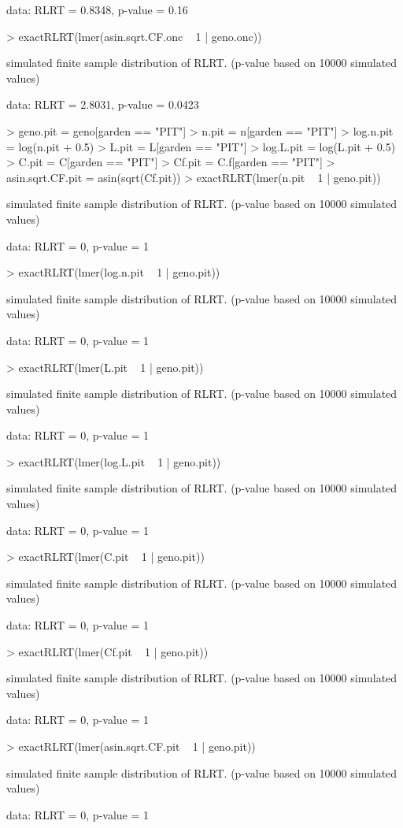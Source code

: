 \documentclass[11pt]{amsart}
\begin{document}
\begin{Schunk}
data:  
RLRT = 0.8348, p-value = 0.16\begin{Sinput}
> exactRLRT(lmer(asin.sqrt.CF.onc ~ 1 | geno.onc))
\end{Sinput}
	simulated finite sample distribution of RLRT.  (p-value based on 10000
	simulated values)

data:  
RLRT = 2.8031, p-value = 0.0423\begin{Sinput}
> geno.pit = geno[garden == "PIT"]
> n.pit = n[garden == "PIT"]
> log.n.pit = log(n.pit + 0.5)
> L.pit = L[garden == "PIT"]
> log.L.pit = log(L.pit + 0.5)
> C.pit = C[garden == "PIT"]
> Cf.pit = C.f[garden == "PIT"]
> asin.sqrt.CF.pit = asin(sqrt(Cf.pit))
> exactRLRT(lmer(n.pit ~ 1 | geno.pit))
\end{Sinput}
	simulated finite sample distribution of RLRT.  (p-value based on 10000
	simulated values)

data:  
RLRT = 0, p-value = 1\begin{Sinput}
> exactRLRT(lmer(log.n.pit ~ 1 | geno.pit))
\end{Sinput}
	simulated finite sample distribution of RLRT.  (p-value based on 10000
	simulated values)

data:  
RLRT = 0, p-value = 1\begin{Sinput}
> exactRLRT(lmer(L.pit ~ 1 | geno.pit))
\end{Sinput}
	simulated finite sample distribution of RLRT.  (p-value based on 10000
	simulated values)

data:  
RLRT = 0, p-value = 1\begin{Sinput}
> exactRLRT(lmer(log.L.pit ~ 1 | geno.pit))
\end{Sinput}
	simulated finite sample distribution of RLRT.  (p-value based on 10000
	simulated values)

data:  
RLRT = 0, p-value = 1\begin{Sinput}
> exactRLRT(lmer(C.pit ~ 1 | geno.pit))
\end{Sinput}
	simulated finite sample distribution of RLRT.  (p-value based on 10000
	simulated values)

data:  
RLRT = 0, p-value = 1\begin{Sinput}
> exactRLRT(lmer(Cf.pit ~ 1 | geno.pit))
\end{Sinput}
	simulated finite sample distribution of RLRT.  (p-value based on 10000
	simulated values)

data:  
RLRT = 0, p-value = 1\begin{Sinput}
> exactRLRT(lmer(asin.sqrt.CF.pit ~ 1 | geno.pit))
\end{Sinput}
	simulated finite sample distribution of RLRT.  (p-value based on 10000
	simulated values)

data:  
RLRT = 0, p-value = 1\end{Schunk}
\end{document}
